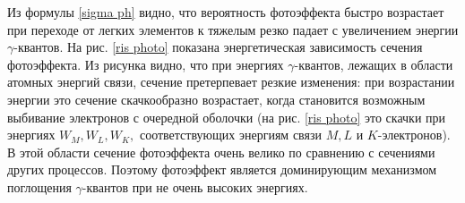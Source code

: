 Из формулы \eqref{sigma ph} видно, что вероятность фотоэффекта быстро возрастает
при переходе от легких элементов к тяжелым резко падает с увеличением энергии
$\gamma$-квантов. На рис. \ref{ris photo} показана энергетическая зависимость
сечения фотоэффекта. Из рисунка видно, что при энергиях $\gamma$-квантов,
лежащих в области атомных энергий связи, сечение претерпевает резкие изменения:
при возрастании энергии это сечение скачкообразно возрастает, когда становится
возможным выбивание электронов с очередной оболочки (на рис. \ref{ris photo} это
скачки при энергиях $ W_M, W_L, W_K, $ соответствующих энергиям связи $ M, L $
и $ K $-электронов). В этой области сечение фотоэффекта очень велико по
сравнению с сечениями других процессов. Поэтому фотоэффект является доминирующим
механизмом поглощения $\gamma$-квантов при не очень высоких энергиях.
